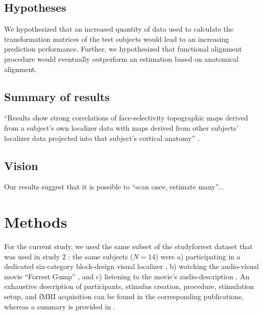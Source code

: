 \subsection{Hypotheses}

%
We hypothesized that an increased quantity of data used to calculate the
transformation matrices of the test subjects would lead to an increasing
prediction performance.
%
Further, we hypothesized that functional alignment procedure would eventually
outperform an estimation based on anatomical alignment.


\subsection{Summary of results}


``Results show strong correlations of face-selectivity topographic maps derived
from a subject's own localizer data with maps derived from other subjects'
localizer data projected into that subject's cortical anatomy''
\citep{jiahui2020predicting}.


\subsection{Vision}


Our results suggest that it is possible to ``scan once, estimate many''...



\section{Methods}



For the current study, we used the same subset of the studyforrest dataset that
was used in study 2 \citep{haeusler2022processing}:
%
the same subjects ($N=14$) were
a) participating in a dedicated six-category block-design visual localizer
\citep{sengupta2016extension},
b) watching the audio-visual movie ``Forrest Gump''
\citep{hanke2016simultaneous}, and
c) listening to the movie's audio-description \citep{hanke2014audiomovie}.
An exhaustive description of participants, stimulus creation, procedure,
stimulation setup, and fMRI acquisition can be found in the corresponding
publications, whereas a summary is provided in \citet{haeusler2022processing}.



